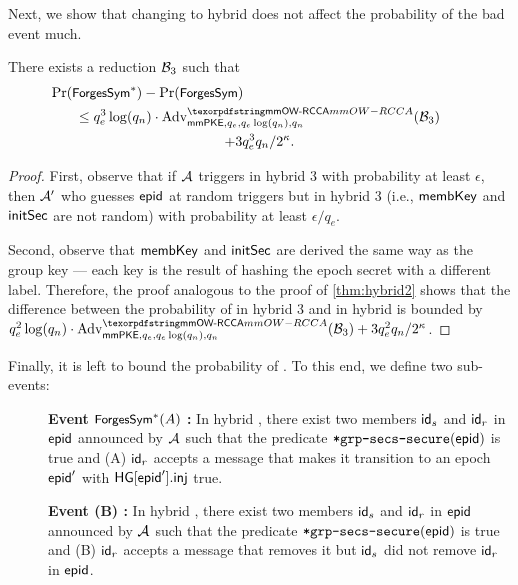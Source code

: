 Next, we show that changing to hybrid \hybridThreeN does not affect the probability of the bad event much.
\begin{claim}
  There exists a reduction $\Bdv[3]$ such that
  \begin{multline*}
    \Pr(\forgessN) - \Pr(\forgess) \hspace*{16em}\\\leq q_e^3\log(q_n) \cdot
    \textnormal{Adv}^{\mmowrcca}_{\mmPKE,q_e,q_e\log(q_n),q_n}(\Bdv[3]) \\
    + 3q_e^3q_n/2^\kappa.
  \end{multline*}
\end{claim}
\begin{proof}
  First, observe that if $\Adv$ triggers \forgess in hybrid 3 with probability at least $\epsilon$, then $\Adv'$ who guesses $\hgnodeid$ at random triggers \forgessN but in hybrid 3 (i.e., $\membershipKey$ and $\initSecret$ are not random) with probability at least $\epsilon/q_e$.

  Second, observe that $\membershipKey$ and $\initSecret$ are derived the same way as the group key --- each key is the result of hashing the epoch secret with a different label. Therefore, the proof analogous to the proof of \cref{thm:hybrid2} shows that the difference between the probability of \forgessN in hybrid 3 and \forgessN in hybrid \hybridThreeN is bounded by $q_e^2\log(q_n) \cdot \textnormal{Adv}^{\mmowrcca}_{\mmPKE,q_e,q_e\log(q_n),q_n}(\Bdv[3]) + 3q_e^2q_n/2^\kappa$.
\end{proof}

Finally, it is left to bound the probability of \forgessN. To this end, we define two sub-events:
\begin{description}
  \item[] {\bf Event $\forgessN(A)$ : } In hybrid \hybridThreeN, there exist two members $\id_s$ and $\id_r$ in $\hgnodeid$ announced by $\Adv$ such that the predicate $\safeGrpSecsSecure(\hgnodeid)$ is true and (A) $\id_r$ accepts a message that makes it transition to an epoch $\hgnodeid'$ with $\hg[\hgnodeid'].\hginj$ true.
  \item[] {\bf Event \forgessN(B) : } In hybrid \hybridThreeN, there exist two members $\id_s$ and $\id_r$ in $\hgnodeid$ announced by $\Adv$ such that the predicate $\safeGrpSecsSecure(\hgnodeid)$ is true and (B) $\id_r$ accepts a message that removes it but $\id_s$ did not remove $\id_r$ in $\hgnodeid$.
\end{description}

